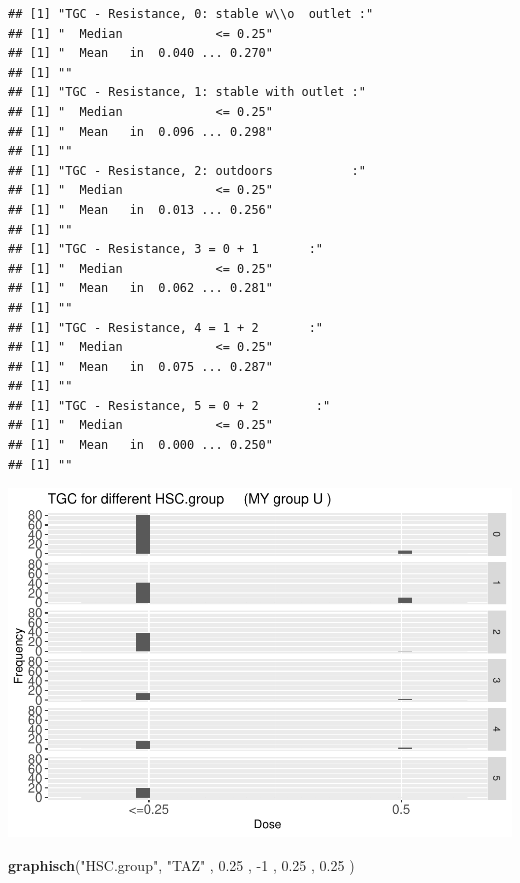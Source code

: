 \documentclass[
]{article}
\newenvironment{Shaded}{\begin{snugshade}}{\end{snugshade}}
\newcommand{\DecValTok}[1]{\textcolor[rgb]{0.00,0.00,0.81}{#1}}
\newcommand{\FloatTok}[1]{\textcolor[rgb]{0.00,0.00,0.81}{#1}}
\newcommand{\KeywordTok}[1]{\textcolor[rgb]{0.13,0.29,0.53}{\textbf{#1}}}
\newcommand{\NormalTok}[1]{#1}
\newcommand{\StringTok}[1]{\textcolor[rgb]{0.31,0.60,0.02}{#1}}
\begin{document}
\begin{verbatim}
## [1] "TGC - Resistance, 0: stable w\\o  outlet :"
## [1] "  Median             <= 0.25"
## [1] "  Mean   in  0.040 ... 0.270"
## [1] ""
## [1] "TGC - Resistance, 1: stable with outlet :"
## [1] "  Median             <= 0.25"
## [1] "  Mean   in  0.096 ... 0.298"
## [1] ""
## [1] "TGC - Resistance, 2: outdoors           :"
## [1] "  Median             <= 0.25"
## [1] "  Mean   in  0.013 ... 0.256"
## [1] ""
## [1] "TGC - Resistance, 3 = 0 + 1       :"
## [1] "  Median             <= 0.25"
## [1] "  Mean   in  0.062 ... 0.281"
## [1] ""
## [1] "TGC - Resistance, 4 = 1 + 2       :"
## [1] "  Median             <= 0.25"
## [1] "  Mean   in  0.075 ... 0.287"
## [1] ""
## [1] "TGC - Resistance, 5 = 0 + 2        :"
## [1] "  Median             <= 0.25"
## [1] "  Mean   in  0.000 ... 0.250"
## [1] ""
\end{verbatim}

\includegraphics{Verteilungen_files/figure-latex/unnamed-chunk-49-1.pdf}

\begin{Shaded}
\begin{Highlighting}[]
   \KeywordTok{graphisch}\NormalTok{(}\StringTok{"HSC.group"}\NormalTok{, }\StringTok{"TAZ"}\NormalTok{ , }\FloatTok{0.25}\NormalTok{ ,  }\DecValTok{-1}\NormalTok{   ,   }\FloatTok{0.25}\NormalTok{ ,   }\FloatTok{0.25}\NormalTok{ )  }
\end{Highlighting}
\end{Shaded}
\end{document}
